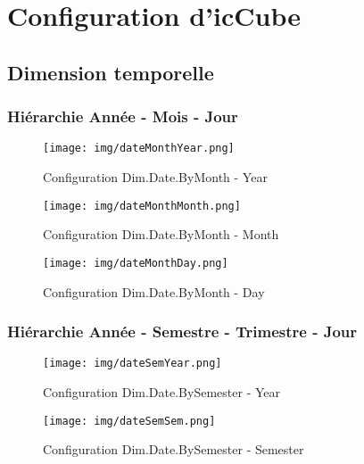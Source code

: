 \section{Configuration d'icCube}

\subsection{Dimension temporelle}


\subsubsection*{Hiérarchie Année - Mois - Jour}

\begin{figure}[H]
    \centering
    \texttt{[image: img/dateMonthYear.png]}
    \caption{Configuration Dim.Date.ByMonth - Year}
    \label{dateMonthYear}
\end{figure}

\begin{figure}[H]
    \centering
    \texttt{[image: img/dateMonthMonth.png]}
    \caption{Configuration Dim.Date.ByMonth - Month}
    \label{dateMonthMonth}
\end{figure}

\begin{figure}[H]
    \centering
    \texttt{[image: img/dateMonthDay.png]}
    \caption{Configuration Dim.Date.ByMonth - Day}
    \label{dateMonthDay}
\end{figure}

\subsubsection*{Hiérarchie Année - Semestre - Trimestre - Jour}

\begin{figure}[H]
    \centering
    \texttt{[image: img/dateSemYear.png]}
    \caption{Configuration Dim.Date.BySemester - Year}
    \label{dateSemYear}
\end{figure}

\begin{figure}[H]
    \centering
    \texttt{[image: img/dateSemSem.png]}
    \caption{Configuration Dim.Date.BySemester - Semester}
    \label{dateSemSem}
\end{figure}

